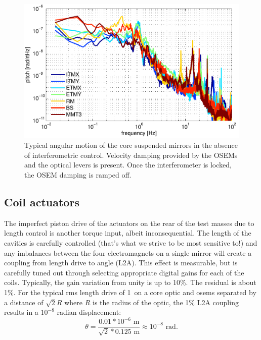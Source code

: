 \begin{figure}
\begin{centering}
\includegraphics[width=1.0\columnwidth]{figures/seismic_mirrormotion.pdf}
\caption{Typical angular motion of the core suspended mirrors in the
  absence of interferometric control. Velocity damping provided by the
  OSEMs and the optical levers is present. Once the interferometer is locked, the OSEM damping is ramped off. 
}
\label{fig:seismicMirror}
\end{centering}
\end{figure}






\subsection{Coil actuators} 
\label{sec:L2A}
The imperfect piston drive of the actuators on the rear of the test masses due to length control is another torque input, albeit inconsequential. The length of the cavities is carefully controlled (that's what we strive to be most sensitive to!) and any imbalances between the four electromagnets on a single mirror will create a coupling from length drive to angle (L2A). This effect is measurable, but is carefully tuned out through selecting appropriate digital gains for each of the coils. Typically, the gain variation from unity is up to 10\%. The residual is about 1\%. For the typical rms length drive of 1~\micron on a core optic and osems separated by a distance of $\sqrt{2} R$ where $R$ is the radius of the optic, the 1\% L2A coupling results in a $10^{-8}$ radian displacement:
\begin{equation}
\theta = \frac{0.01 * 10^{-6} \mbox{ m}}{\sqrt{2} * 0.125 \mbox{ m}} \approx 10^{-8} \mbox{ rad}.
\end{equation}

